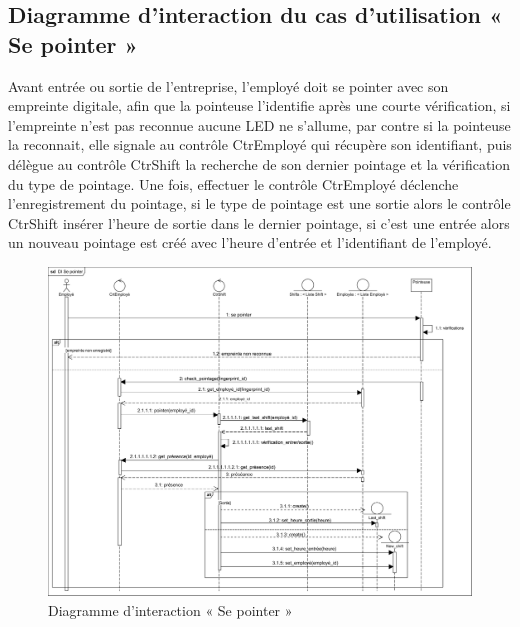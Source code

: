     \subsection*{Diagramme d'interaction du cas d'utilisation « Se pointer »}
   Avant entrée ou sortie de l’entreprise, l’employé doit se pointer avec son empreinte digitale, afin que la pointeuse l’identifie après une courte vérification, si l’empreinte n’est pas reconnue aucune LED ne s’allume, par contre si la pointeuse la reconnait, elle signale au contrôle CtrEmployé qui récupère son identifiant, puis délègue au contrôle CtrShift la recherche de son dernier pointage et la vérification du type de pointage. Une fois, effectuer le contrôle CtrEmployé déclenche l’enregistrement du pointage, si le type de pointage est une sortie alors le contrôle CtrShift insérer l’heure de sortie dans le dernier pointage, si c’est une entrée alors un nouveau pointage est créé avec l’heure d’entrée et l’identifiant de l’employé. 
        \begin{figure}[h!]
                 \centering
                \includegraphics[scale=0.56]{images/DS/DI Se pointer.png}
                 \caption{Diagramme d'interaction « Se pointer »}
                 \label{fig34}
        \end{figure}
        
    \clearpage
    
